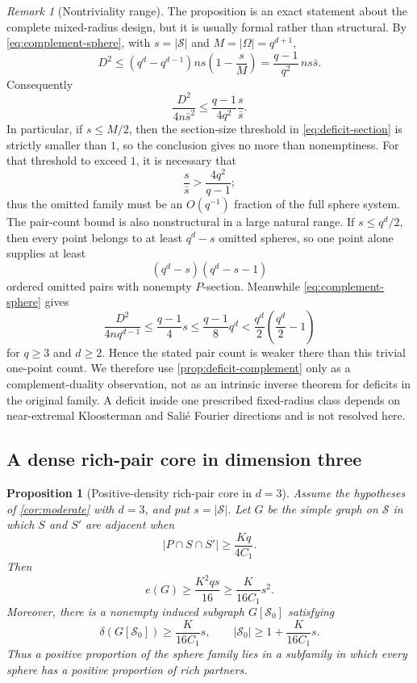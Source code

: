 \documentclass[11pt,letterpaper]{amsart}
\newtheorem{proposition}[proposition]{Proposition}
\theoremstyle{definition}
\theoremstyle{remark}
\newtheorem{remark}[remark]{Remark}
\newcommand{\1}{\mathbf 1}
\begin{document}
\begin{remark}[Nontriviality range]\label{rem:deficit-scope}
The proposition is an exact statement about the complete mixed-radius design, but it is usually formal rather than structural.  By \eqref{eq:complement-sphere}, with $s=|\mathcal S|$ and $M=|\Omega|=q^{d+1}$,
\[
 D^2\le(q^d-q^{d-1})ns\left(1-\frac{s}{M}\right)
 =\frac{q-1}{q^2}\,ns\bar s.
\]
Consequently
\begin{equation}\label{eq:deficit-nontriviality}
 \frac{D^2}{4n\bar s^2}
 \le \frac{q-1}{4q^2}\frac{s}{\bar s}.
\end{equation}
In particular, if $s\le M/2$, then the section-size threshold in \eqref{eq:deficit-section} is strictly smaller than $1$, so the conclusion gives no more than nonemptiness.  For that threshold to exceed $1$, it is necessary that
\[
 \frac{s}{\bar s}>\frac{4q^2}{q-1};
\]
thus the omitted family must be an $O(q^{-1})$ fraction of the full sphere system.  The pair-count bound is also nonstructural in a large natural range.  If $s\le q^d/2$, then every point belongs to at least $q^d-s$ omitted spheres, so one point alone supplies at least
\[
 (q^d-s)(q^d-s-1)
\]
ordered omitted pairs with nonempty $P$-section.  Meanwhile \eqref{eq:complement-sphere} gives
\[
 \frac{D^2}{4nq^{d-1}}
 \le \frac{q-1}{4}s
 \le \frac{q-1}{8}q^d
 <\frac{q^d}{2}\left(\frac{q^d}{2}-1\right)
\]
for $q\ge3$ and $d\ge2$.  Hence the stated pair count is weaker there than this trivial one-point count.  We therefore use \cref{prop:deficit-complement} only as a complement-duality observation, not as an intrinsic inverse theorem for deficits in the original family.  A deficit inside one prescribed fixed-radius class depends on near-extremal Kloosterman and Sali\'e Fourier directions and is not resolved here.
\end{remark}

\subsection{A dense rich-pair core in dimension three}

\begin{proposition}[Positive-density rich-pair core in $d=3$]\label{prop:d3-core}
Assume the hypotheses of \cref{cor:moderate} with $d=3$, and put $s=|\mathcal S|$.  Let $G$ be the simple graph on $\mathcal S$ in which $S$ and $S'$ are adjacent when
\[
 |P\cap S\cap S'|\ge\frac{Kq}{4C_1}.
\]
Then
\begin{equation}\label{eq:d3-density}
 e(G)\ge\frac{K^2qs}{16}\ge\frac{K}{16C_1}s^2.
\end{equation}
Moreover, there is a nonempty induced subgraph $G[\mathcal S_0]$ satisfying
\begin{equation}\label{eq:d3-core}
 \delta(G[\mathcal S_0])\ge\frac{K}{16C_1}s,
 \qquad
 |\mathcal S_0|\ge1+\frac{K}{16C_1}s.
\end{equation}
Thus a positive proportion of the sphere family lies in a subfamily in which every sphere has a positive proportion of rich partners.
\end{proposition}
\end{document}
